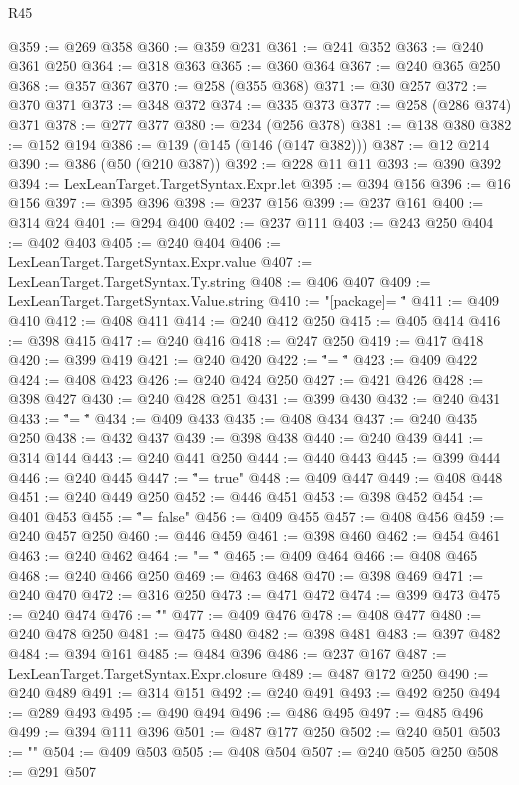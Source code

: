 \begin{lexlean}{R45}
\begin{coremodule}
@359 := @269 @358
@360 := @359 @231
@361 := @241 @352
@363 := @240 @361 @250
@364 := @318 @363
@365 := @360 @364
@367 := @240 @365 @250
@368 := @357 @367
@370 := @258 (@355 @368)
@371 := @30 @257
@372 := @370 @371
@373 := @348 @372
@374 := @335 @373
@377 := @258 (@286 @374) @371
@378 := @277 @377
@380 := @234 (@256 @378)
@381 := @138 @380
@382 := @152 @194
@386 := @139 (@145 (@146 (@147 @382)))
@387 := @12 @214
@390 := @386 (@50 (@210 @387))
@392 := @228 @11 @11
@393 := @390 @392
@394 := LexLeanTarget.TargetSyntax.Expr.let
@395 := @394 @156
@396 := @16 @156
@397 := @395 @396
@398 := @237 @156
@399 := @237 @161
@400 := @314 @24
@401 := @294 @400
@402 := @237 @111
@403 := @243 @250
@404 := @402 @403
@405 := @240 @404
@406 := LexLeanTarget.TargetSyntax.Expr.value
@407 := LexLeanTarget.TargetSyntax.Ty.string
@408 := @406 @407
@409 := LexLeanTarget.TargetSyntax.Value.string
@410 := "[package]\nname = \""
@411 := @409 @410
@412 := @408 @411
@414 := @240 @412 @250
@415 := @405 @414
@416 := @398 @415
@417 := @240 @416
@418 := @247 @250
@419 := @417 @418
@420 := @399 @419
@421 := @240 @420
@422 := "\"\nversion = \""
@423 := @409 @422
@424 := @408 @423
@426 := @240 @424 @250
@427 := @421 @426
@428 := @398 @427
@430 := @240 @428 @251
@431 := @399 @430
@432 := @240 @431
@433 := "\"\nedition = \""
@434 := @409 @433
@435 := @408 @434
@437 := @240 @435 @250
@438 := @432 @437
@439 := @398 @438
@440 := @240 @439
@441 := @314 @144
@443 := @240 @441 @250
@444 := @440 @443
@445 := @399 @444
@446 := @240 @445
@447 := "\"\npublish = true"
@448 := @409 @447
@449 := @408 @448
@451 := @240 @449 @250
@452 := @446 @451
@453 := @398 @452
@454 := @401 @453
@455 := "\"\npublish = false"
@456 := @409 @455
@457 := @408 @456
@459 := @240 @457 @250
@460 := @446 @459
@461 := @398 @460
@462 := @454 @461
@463 := @240 @462
@464 := "\n\n[lib]\npath = \""
@465 := @409 @464
@466 := @408 @465
@468 := @240 @466 @250
@469 := @463 @468
@470 := @398 @469
@471 := @240 @470
@472 := @316 @250
@473 := @471 @472
@474 := @399 @473
@475 := @240 @474
@476 := "\"\n{}\n"
@477 := @409 @476
@478 := @408 @477
@480 := @240 @478 @250
@481 := @475 @480
@482 := @398 @481
@483 := @397 @482
@484 := @394 @161
@485 := @484 @396
@486 := @237 @167
@487 := LexLeanTarget.TargetSyntax.Expr.closure
@489 := @487 @172 @250
@490 := @240 @489
@491 := @314 @151
@492 := @240 @491
@493 := @492 @250
@494 := @289 @493
@495 := @490 @494
@496 := @486 @495
@497 := @485 @496
@499 := @394 @111 @396
@501 := @487 @177 @250
@502 := @240 @501
@503 := "\n"
@504 := @409 @503
@505 := @408 @504
@507 := @240 @505 @250
@508 := @291 @507

\end{coremodule}
\end{lexlean}

